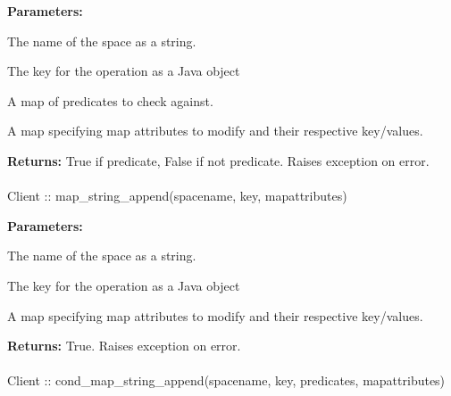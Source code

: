 \noindent\textbf{Parameters:}
\begin{description}[labelindent=\widthof{{\code{mapattributes}}},leftmargin=*,noitemsep,nolistsep,align=right]
\item[\code{spacename}] The name of the space as a string.
\item[\code{key}] The key for the operation as a Java object
\item[\code{predicates}] A map of predicates to check against.
\item[\code{mapattributes}] A map specifying map attributes to modify and their respective key/values.
\end{description}

\noindent\textbf{Returns:}
True if predicate, False if not predicate.  Raises exception on error.

\paragraph{}
\label{api:java:map_string_append}
\begin{javacode}
Client :: map_string_append(spacename, key, mapattributes)
\end{javacode}
\funcdesc 

\noindent\textbf{Parameters:}
\begin{description}[labelindent=\widthof{{\code{mapattributes}}},leftmargin=*,noitemsep,nolistsep,align=right]
\item[\code{spacename}] The name of the space as a string.
\item[\code{key}] The key for the operation as a Java object
\item[\code{mapattributes}] A map specifying map attributes to modify and their respective key/values.
\end{description}

\noindent\textbf{Returns:}
True.  Raises exception on error.

\paragraph{}
\label{api:java:cond_map_string_append}
\begin{javacode}
Client :: cond_map_string_append(spacename, key, predicates, mapattributes)
\end{javacode}
\funcdesc 


